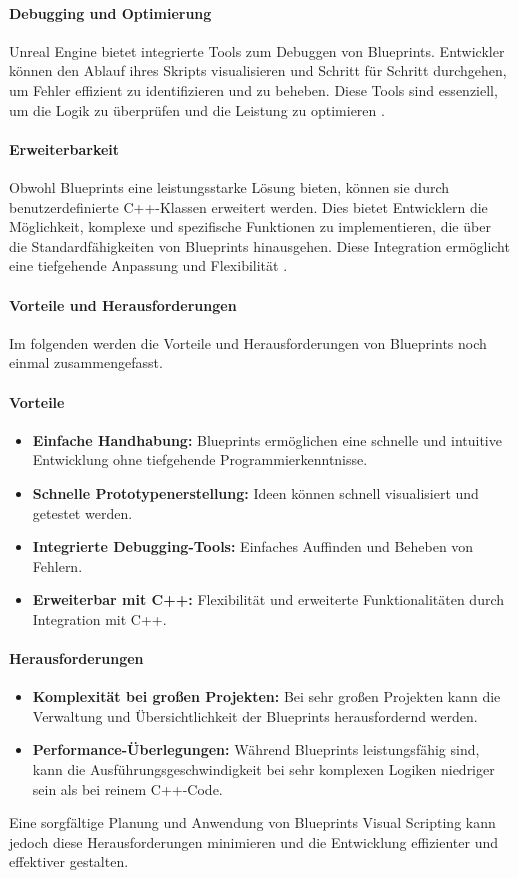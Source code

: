 \paragraph{Debugging und Optimierung}
Unreal Engine bietet integrierte Tools zum Debuggen von Blueprints. Entwickler können den Ablauf ihres Skripts visualisieren und Schritt für Schritt durchgehen, um Fehler effizient zu identifizieren und zu beheben. Diese Tools sind essenziell, um die Logik zu überprüfen und die Leistung zu optimieren \cite{unrealDebug}.

\paragraph{Erweiterbarkeit}
Obwohl Blueprints eine leistungsstarke Lösung bieten, können sie durch benutzerdefinierte C++-Klassen erweitert werden. Dies bietet Entwicklern die Möglichkeit, komplexe und spezifische Funktionen zu implementieren, die über die Standardfähigkeiten von Blueprints hinausgehen. Diese Integration ermöglicht eine tiefgehende Anpassung und Flexibilität \cite{unrealCplusplus}.

\paragraph{Vorteile und Herausforderungen} 
Im folgenden werden die Vorteile und Herausforderungen von Blueprints noch einmal zusammengefasst.
\paragraph{Vorteile}
\begin{itemize}
    \item \textbf{Einfache Handhabung:} Blueprints ermöglichen eine schnelle und intuitive Entwicklung ohne tiefgehende Programmierkenntnisse.
    \item \textbf{Schnelle Prototypenerstellung:} Ideen können schnell visualisiert und getestet werden.
    \item \textbf{Integrierte Debugging-Tools:} Einfaches Auffinden und Beheben von Fehlern.
    \item \textbf{Erweiterbar mit C++:} Flexibilität und erweiterte Funktionalitäten durch Integration mit C++.
\end{itemize}

\paragraph{Herausforderungen}
\begin{itemize}
    \item \textbf{Komplexität bei großen Projekten:} Bei sehr großen Projekten kann die Verwaltung und Übersichtlichkeit der Blueprints herausfordernd werden.
    \item \textbf{Performance-Überlegungen:} Während Blueprints leistungsfähig sind, kann die Ausführungsgeschwindigkeit bei sehr komplexen Logiken niedriger sein als bei reinem C++-Code.
\end{itemize}
\noindent
Eine sorgfältige Planung und Anwendung von Blueprints Visual Scripting kann jedoch diese Herausforderungen minimieren und die Entwicklung effizienter und effektiver gestalten.


